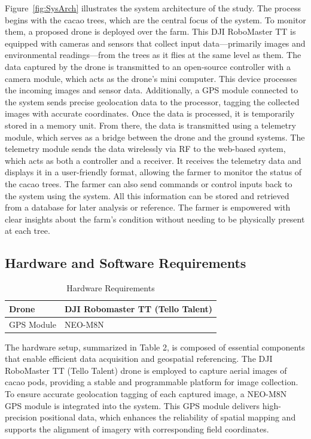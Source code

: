 Figure~\ref{fig:SysArch} illustrates the system architecture of the study. The process begins with the cacao trees, which are the central focus of the system. To monitor them, a proposed drone is deployed over the farm. This DJI RoboMaster TT is equipped with cameras and sensors that collect input data—primarily images and environmental readings—from the trees as it flies at the same level as them. The data captured by the drone is transmitted to an open-source controller with a camera module, which acts as the drone’s mini computer. This device processes the incoming images and sensor data. Additionally, a GPS module connected to the system sends precise geolocation data to the processor, tagging the collected images with accurate coordinates. Once the data is processed, it is temporarily stored in a memory unit. From there, the data is transmitted using a telemetry module, which serves as a bridge between the drone and the ground systems. The telemetry module sends the data wirelessly via RF to the web-based system, which acts as both a controller and a receiver. It receives the telemetry data and displays it in a user-friendly format, allowing the farmer to monitor the status of the cacao trees. The farmer can also send commands or control inputs back to the system using the system. All this information can be stored and retrieved from a database for later analysis or reference. The farmer is empowered with clear insights about the farm’s condition without needing to be physically present at each tree.


\subsection{Hardware and Software Requirements}

\begin{table}[H]
	\centering
	\caption{Hardware Requirements}
	\label{tab:hardreq}
	\begin{tabular}{ll}
		\toprule
		Drone      & DJI Robomaster TT (Tello Talent) \\
		\midrule
		GPS Module & NEO-M8N                          \\
		\bottomrule
	\end{tabular}
\end{table}

The hardware setup, summarized in Table 2, is composed of essential components that enable efficient data acquisition and geospatial referencing. The DJI RoboMaster TT (Tello Talent) drone is employed to capture aerial images of cacao pods, providing a stable and programmable platform for image collection. To ensure accurate geolocation tagging of each captured image, a NEO-M8N GPS module is integrated into the system. This GPS module delivers high-precision positional data, which enhances the reliability of spatial mapping and supports the alignment of imagery with corresponding field coordinates.


